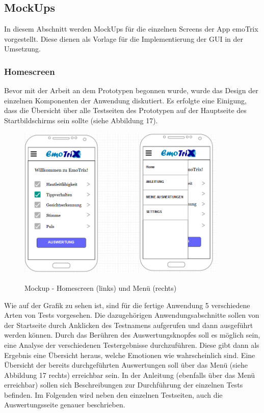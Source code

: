 \subsection{MockUps}
In diesem Abschnitt werden MockUps für die einzelnen Screens der App emoTrix vorgestellt. Diese dienen als Vorlage für die Implementierung der GUI in der Umsetzung.
\subsubsection{Homescreen}
Bevor mit der Arbeit an dem Prototypen begonnen wurde, wurde  das Design der einzelnen Komponenten der Anwendung diskutiert. Es erfolgte eine Einigung, dass die Übersicht über alle Testseiten des Prototypen auf der Hauptseite des Startbildschirms sein sollte (siehe Abbildung 17).
\begin{figure}[h]
	\centering
	\includegraphics[width=10cm]{Bilder/Mockup-Home.png}
	\label{img:Mockup-Home}
	\caption[Mockup - Homescreen (links) und Menü (rechts)]{Mockup - Homescreen (links) und Menü (rechts)}
\end{figure}%
\newline
Wie auf der Grafik zu sehen ist, sind für die fertige Anwendung 5 verschiedene Arten von Tests vorgesehen. Die dazugehörigen Anwendungsabschnitte sollen von der Startseite durch Anklicken des Testnamens aufgerufen und dann ausgeführt werden können. Durch das Berühren des Auswertungsknopfes soll es möglich sein, eine Analyse der verschiedenen Testergebnisse durchzuführen. Diese gibt dann als Ergebnis eine Übersicht heraus, welche Emotionen wie wahrscheinlich sind. Eine Übersicht der bereits durchgeführten Auswertungen soll über das Menü (siehe Abbildung 17 rechts) erreichbar sein. In der Anleitung (ebenfalls über das Menü erreichbar) sollen sich Beschreibungen zur Durchführung der einzelnen Tests befinden.\newline
Im Folgenden wird neben den einzelnen Testseiten, auch die Auswertungsseite genauer beschrieben.  
